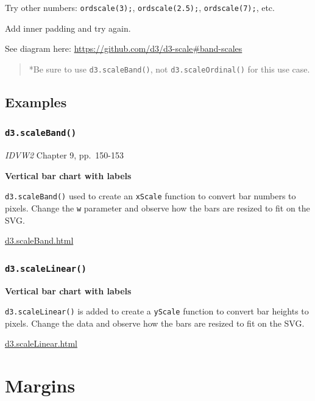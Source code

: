 \documentclass[
  openany]{book}
\begin{document}
Try other numbers: \texttt{ordscale(3);}, \texttt{ordscale(2.5);}, \texttt{ordscale(7);}, etc.

Add inner padding and try again.

See diagram here: \url{https://github.com/d3/d3-scale\#band-scales}

\begin{quote}
*Be sure to use \texttt{d3.scaleBand()}, not \texttt{d3.scaleOrdinal()} for this use case.
\end{quote}

\hypertarget{examples}{%
\subsection{Examples}\label{examples}}

\hypertarget{d3.scaleband}{%
\subsubsection*{\texorpdfstring{\texttt{d3.scaleBand()}}{d3.scaleBand()}}\label{d3.scaleband}}

\emph{IDVW2} Chapter 9, pp.~150-153

\textbf{Vertical bar chart with labels}

\texttt{d3.scaleBand()} used to create an \texttt{xScale} function to convert bar numbers to pixels. Change the \texttt{w} parameter and observe how the bars are resized to fit on the SVG.

\href{code/d3.scaleBand.html}{d3.scaleBand.html}

\hypertarget{d3.scalelinear}{%
\subsubsection*{\texorpdfstring{\texttt{d3.scaleLinear()}}{d3.scaleLinear()}}\label{d3.scalelinear}}

\textbf{Vertical bar chart with labels}

\texttt{d3.scaleLinear()} is added to create a \texttt{yScale} function to convert bar heights to pixels. Change the data and observe how the bars are resized to fit on the SVG.

\href{code/d3.scaleLinear.html}{d3.scaleLinear.html}

\hypertarget{margins}{%
\section{Margins}\label{margins}}
\end{document}

